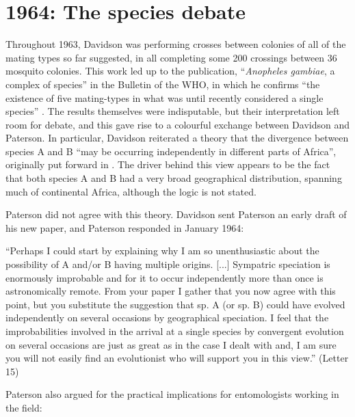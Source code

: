 \documentclass[a4paper,11pt,abstracton,hidelinks]{scrartcl}
\begin{document}
\section{1964: The species debate}


Throughout 1963, Davidson was performing crosses between colonies of all of the mating types so far suggested, in all completing some 200 crossings between 36 mosquito colonies. 
This work led up to the publication, ``\textit{Anopheles gambiae}, a complex of species'' in the Bulletin of the WHO, in which he confirms ``the existence of five mating-types in what was until recently considered a single species'' \citep{Davidson1964}. 
The results themselves were indisputable, but their interpretation left room for debate, and this gave rise to a colourful exchange between Davidson and Paterson. 
In particular, Davidson reiterated a theory that the divergence between species A and B ``may be occurring independently in different parts of Africa'', originally put forward in \citet{Davidson1962a}. 
The driver behind this view appears to be the fact that both species A and B had a very broad geographical distribution, spanning much of continental Africa, although the logic is not stated.


Paterson did not agree with this theory. Davidson sent Paterson an early draft of his new paper, and Paterson responded in January 1964:


\begin{displayquote}
``Perhaps I could start by explaining why I am so unenthusiastic about the possibility of A and/or B having multiple origins. [...] Sympatric speciation is enormously improbable and for it to occur independently more than once is astronomically remote. From your paper I gather that you now agree with this point, but you substitute the suggestion that sp. A (or sp. B) could have evolved independently on several occasions by geographical speciation. I feel that the improbabilities involved in the arrival at a single species by convergent evolution on several occasions are just as great as in the case I dealt with and, I am sure you will not easily find an evolutionist who will support you in this view.'' (Letter 15)
\end{displayquote}


Paterson also argued for the practical implications for entomologists working in the field:
\end{document}
